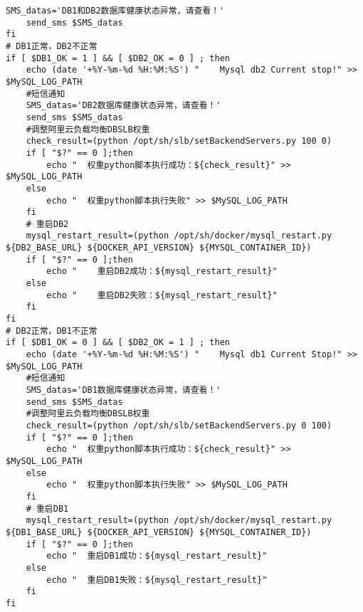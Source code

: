 \begin{lstlisting}[numbers=none]
    SMS_datas='DB1和DB2数据库健康状态异常，请查看！'
    send_sms $SMS_datas
fi
# DB1正常，DB2不正常
if [ $DB1_OK = 1 ] && [ $DB2_OK = 0 ] ; then
    echo (date '+%Y-%m-%d %H:%M:%S') "    Mysql db2 Current stop!" >> $MySQL_LOG_PATH
    #短信通知
    SMS_datas='DB2数据库健康状态异常，请查看！'
    send_sms $SMS_datas
    #调整阿里云负载均衡DBSLB权重
    check_result=(python /opt/sh/slb/setBackendServers.py 100 0)
    if [ "$?" == 0 ];then
        echo "  权重python脚本执行成功：${check_result}" >> $MySQL_LOG_PATH
    else
        echo "  权重python脚本执行失败" >> $MySQL_LOG_PATH
    fi
    # 重启DB2
    mysql_restart_result=(python /opt/sh/docker/mysql_restart.py ${DB2_BASE_URL} ${DOCKER_API_VERSION} ${MYSQL_CONTAINER_ID})
    if [ "$?" == 0 ];then
        echo "    重启DB2成功：${mysql_restart_result}"
    else
        echo "    重启DB2失败：${mysql_restart_result}"
    fi
fi
# DB2正常，DB1不正常
if [ $DB1_OK = 0 ] && [ $DB2_OK = 1 ] ; then
    echo (date '+%Y-%m-%d %H:%M:%S') "    Mysql db1 Current Stop!" >> $MySQL_LOG_PATH
    #短信通知
    SMS_datas='DB1数据库健康状态异常，请查看！'
    send_sms $SMS_datas
    #调整阿里云负载均衡DBSLB权重
    check_result=(python /opt/sh/slb/setBackendServers.py 0 100)
    if [ "$?" == 0 ];then
        echo "  权重python脚本执行成功：${check_result}" >> $MySQL_LOG_PATH
    else
        echo "  权重python脚本执行失败" >> $MySQL_LOG_PATH
    fi
    # 重启DB1
    mysql_restart_result=(python /opt/sh/docker/mysql_restart.py ${DB1_BASE_URL} ${DOCKER_API_VERSION} ${MYSQL_CONTAINER_ID})
    if [ "$?" == 0 ];then
        echo "  重启DB1成功：${mysql_restart_result}"
    else
        echo "  重启DB1失败：${mysql_restart_result}"
    fi
fi

\end{lstlisting}